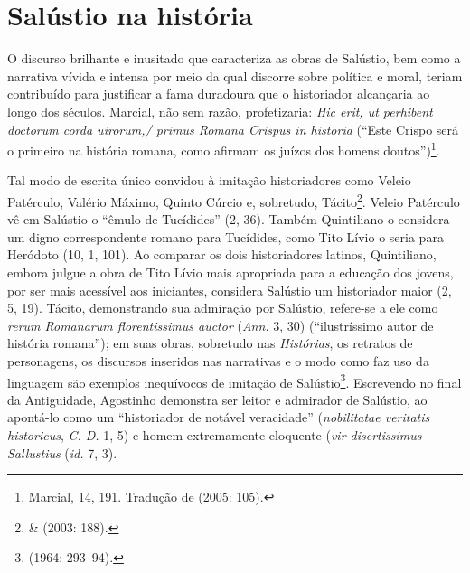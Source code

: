 \newcommand{\lat}{}%
\newcommand{\old}{\textsc{old}}
\newcommand{\lp}{\textsc{lp}}


\newcommand{\bra}{\selectlanguage{brazilian}{}} 
\newcommand{\ot}{\emph{Orator}\ }



\section{Salústio na história} 

O discurso brilhante e inusitado que caracteriza
as obras de Salústio, bem como a narrativa vívida e intensa por meio da qual
discorre sobre política e moral, teriam contribuído para justificar a fama
duradoura que o historiador alcançaria ao longo dos séculos. Marcial, não sem
razão, profetizaria: \emph{Hic erit, ut perhibent doctorum corda uirorum,/
primus Romana Crispus in historia}  (“Este Crispo será o primeiro na história
romana, como afirmam os juízos dos homens doutos”)\footnote{Marcial, 14, 191.
Tradução de  (2005: 105).}. 

Tal modo de escrita único convidou à imitação historiadores como Veleio
Patérculo, Valério Máximo, Quinto Cúrcio e, sobretudo,
Tácito\footnote{ \&   (2003: 188).}. Veleio
Patérculo vê em Salústio o “êmulo de Tucídides” (2, 36). Também Quintiliano o
considera um digno correspondente romano para Tucídides, como Tito Lívio o
seria para Heródoto (10, 1, 101).  Ao comparar os dois historiadores latinos,
Quintiliano, embora julgue a obra de Tito Lívio mais apropriada para a educação
dos jovens, por ser mais acessível aos iniciantes, considera Salústio um
historiador maior (2, 5, 19).  Tácito, demonstrando sua admiração por Salústio,
refere-se a ele como \lat \emph{rerum Romanarum florentissimus auctor} \bra
(\emph{Ann.} 3, 30) (“ilustríssimo autor de história romana”); em suas obras,
sobretudo nas \emph{Histórias},  os retratos de personagens, os discursos
inseridos nas narrativas e o modo como faz uso da linguagem são exemplos
inequívocos de imitação de Salústio\footnote{ (1964: 293--94).}.
Escrevendo no final da Antiguidade, Agostinho  demonstra ser leitor e admirador
de Salústio, ao apontá-lo como um  “historiador de notável veracidade”
(\emph{nobilitatae veritatis historicus}, \emph{C. D.} 1, 5) e homem
extremamente eloquente (\emph{vir disertissimus Sallustius} (\emph{id.} 7, 3). 

